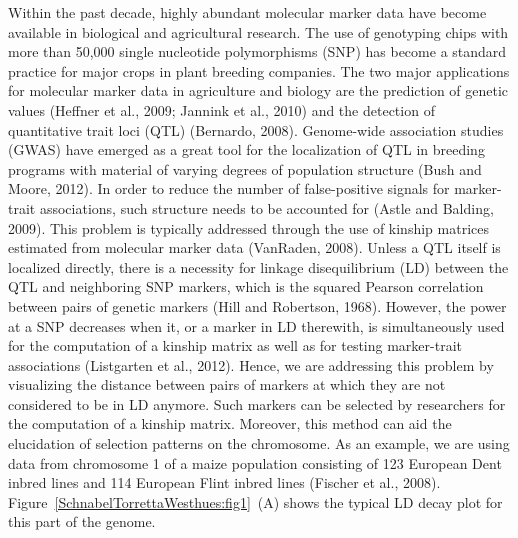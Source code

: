 \documentclass[twoside]{report}
\begin{document}
Within the past decade, highly abundant molecular marker data have become available in biological 
and agricultural research. The use of genotyping chips with more than 50,000 single nucleotide 
polymorphisms (SNP) has become a standard practice for major crops in plant breeding companies. 
The two major applications for molecular marker data in agriculture and biology are the prediction 
of genetic values (Heffner et al., 2009; Jannink et al., 2010) 
and the detection of quantitative trait loci (QTL) 
(Bernardo, 2008). Genome-wide association studies (GWAS) have emerged as a great tool for the 
localization of QTL in breeding programs with material of varying degrees of population structure
(Bush and Moore, 2012). 
In order to reduce the number of false-positive signals for marker-trait associations,
such structure needs to be accounted for (Astle and Balding, 2009). This problem is 
typically addressed through 
the use of kinship matrices estimated from molecular marker data 
(VanRaden, 2008).
Unless a QTL itself is localized directly, there is a necessity for linkage disequilibrium (LD) between
the QTL and neighboring SNP markers, which is the squared Pearson correlation between pairs of genetic
markers (Hill and Robertson, 1968). However, the power at a SNP decreases when it, 
or a marker in LD therewith,
is simultaneously used for the computation of a kinship matrix as well as for testing marker-trait 
associations (Listgarten et al., 2012). 
Hence, we are addressing this problem by visualizing the distance
between pairs of markers at which they are not considered to be in LD anymore. Such markers can be 
selected by researchers for the computation of a kinship matrix. Moreover, this method can aid 
the elucidation
of selection patterns on the chromosome. As an example, we are using data from chromosome 1 of a maize 
population consisting of 123 European Dent inbred lines and 114 European Flint inbred lines
(Fischer et al., 2008). Figure~\ref{SchnabelTorrettaWesthues:fig1}~(A) shows the typical LD decay plot 
for this part of the genome. 
\end{document}
